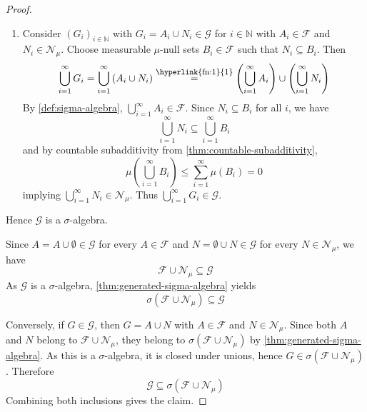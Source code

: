 \begin{proof}
\begin{enumerate}[label=(\roman*)]
\tikzexternalenable
Therefore $G^\complement \in \mathcal{G}$.
\cmark
\item
Consider $(G_i)_{i \in \mathbb{N}}$ with $G_i = A_i \cup N_i \in \mathcal{G}$ for $i \in \mathbb{N}$ with $A_i \in \mathcal{F}$ and $N_i \in \mathcal{N}_\mu$. 
Choose measurable $\mu$-null sets $B_i \in \mathcal{F}$ such that $N_i \subseteq B_i$. 
Then
\[
\bigcup_{i=1}^{\infty} G_i 
= 
\bigcup_{i=1}^{\infty} \left(A_i \cup N_i\right)
\refstepcounter{footnote}
\overset{\text{\normalfont\footnotesize\hyperlink{fn:\thefootnote}{\thefootnote}}}{=}
\left(\bigcup_{i=1}^{\infty} A_i\right) \cup \left(\bigcup_{i=1}^{\infty} N_i\right)
\]
%
By \autoref{def:sigma-algebra}, $\bigcup_{i=1}^{\infty} A_i \in \mathcal{F}$. 
Since $N_i \subseteq B_i$ for all $i$, we have
\[
\bigcup_{i=1}^{\infty} N_i \subseteq \bigcup_{i=1}^{\infty} B_i
\]
and by countable subadditivity from \autoref{thm:countable-subadditivity},
\[
\mu\left(\bigcup_{i=1}^{\infty} B_i\right) \leq \sum_{i=1}^{\infty} \mu(B_i) = 0
\]
implying $\bigcup_{i=1}^{\infty} N_i \in \mathcal{N}_\mu$.
Thus $\bigcup_{i=1}^{\infty} G_i \in \mathcal{G}$. 
\cmark
\end{enumerate}
Hence $\mathcal{G}$ is a $\sigma$-algebra.

Since $A = A \cup \emptyset \in \mathcal{G}$ for every $A \in \mathcal{F}$ and $N = \emptyset \cup N \in \mathcal{G}$ for every $N \in \mathcal{N}_\mu$, we have
\[
\mathcal{F} \cup \mathcal{N}_\mu \subseteq \mathcal{G}
\]
As $\mathcal{G}$ is a $\sigma$-algebra, \autoref{thm:generated-sigma-algebra} yields
\[
\sigma(\mathcal{F} \cup \mathcal{N}_\mu) \subseteq \mathcal{G}
\]

Conversely, if $G \in \mathcal{G}$, then $G = A \cup N$ with $A \in \mathcal{F}$ and $N \in \mathcal{N}_\mu$. Since both $A$ and $N$ belong to $\mathcal{F} \cup \mathcal{N}_\mu$, they belong to $\sigma(\mathcal{F} \cup \mathcal{N}_\mu)$ by \autoref{thm:generated-sigma-algebra}. As this is a $\sigma$-algebra, it is closed under unions, hence $G \in \sigma(\mathcal{F} \cup \mathcal{N}_\mu)$. Therefore
\[
\mathcal{G} \subseteq \sigma(\mathcal{F} \cup \mathcal{N}_\mu)
\]
Combining both inclusions gives the claim.
\end{proof}



